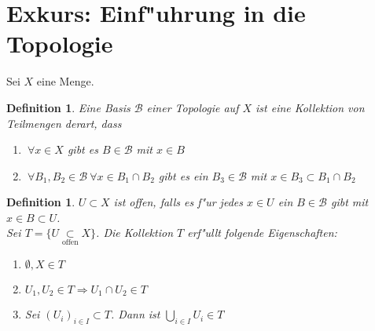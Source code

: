 \documentclass[a4paper,12pt,numbers=noenddot,parskip=full]{scrartcl}
\newcommand{\Forall}{~\forall}
\newcommand{\scrB}{\mathcal{B}}
\theoremstyle{dotless}
\newtheorem{definition}[theorem]{Definition}
\begin{document}
\section{Exkurs: Einf"uhrung in die Topologie}
Sei $X$ eine Menge.
\begin{definition}
	Eine Basis $\scrB$ einer Topologie auf $X$ ist eine Kollektion von Teilmengen derart, dass
	\begin{enumerate}
		\item $\Forall x \in X$ gibt es $B \in \scrB$ mit $x \in B$
		\item $\Forall B_1, B_2 \in \scrB \Forall x \in B_1 \cap B_2$ gibt es ein $B_3 \in \scrB$ mit $x \in B_3 \subset B_1 \cap B_2$
	\end{enumerate}
\end{definition}
\begin{definition}
	$U\subset X$ ist \emph{offen}, falls es f"ur jedes $x \in U$ ein $B \in \scrB$ gibt mit $x \in B \subset U$.\\
	Sei $T = \{ U \underset{\text{offen}}{\subset} X\}$. Die Kollektion $T$ erf"ullt folgende Eigenschaften:
	\begin{enumerate}
		\item $\emptyset, X \in T$
		\item $U_1, U_2 \in T \Rightarrow U_1 \cap U_2 \in T$
		\item Sei $(U_i)_{i \in I} \subset T$. Dann ist $\bigcup\limits_{i \in I} U_i \in T$
	\end{enumerate}
\end{definition}
\end{document}

